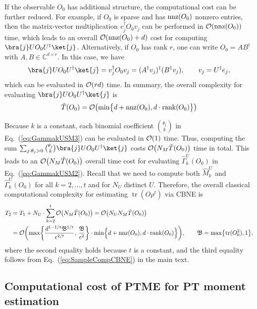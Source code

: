 \documentclass[aps,prl,twocolumn,nofootinbib,superscriptaddress,10pt]{revtex4-2}
\let\originalleft\left
\let\originalright\right
\renewcommand{\left}{\mathopen{}\mathclose\bgroup\originalleft}
\renewcommand{\right}{\aftergroup\egroup\originalright}
\DeclareMathOperator{\Tr}{tr}
\newcommand{\bigo}[1]{\mathcal{O}\left(#1\right)}
\theoremstyle{plain}
\theoremstyle{definition}
\newcommand{\eref}[1]{Eq.~\textup{(\ref{#1})}}
\begin{document}
If the observable $O_0$ has additional structure, the computational cost can be further reduced.
For example, if $O_0$ is sparse and has ${\rm nnz}(O_0)$ nonzero entries, then the  matrix-vector multiplication $v_j^\dagger O_0 v_j$  can be performed in $\bigo{{\rm nnz}(O_0)}$ time, which leads to an overall $\bigo{{\rm nnz}(O_0)+d}$ cost for computing $\bra{j}U O_0 U^\dag\ket{j}$. 
Alternatively, if $O_0$ has rank $r$, one can write $O_0=AB^\dagger$ with $A,B\in\mathbb{C}^{d\times r}$.
In this case, we have 
\begin{equation}
\bra{j}U O_0 U^\dag\ket{j}
=v_j^\dagger O_0 v_j = (A^\dagger v_j)^\dagger (B^\dagger v_j),
\qquad 
v_j=U^\dagger e_j, 
\end{equation}
which can be evaluated in $\bigo{rd}$ time.
In summary, the overall complexity for evaluating $\bra{j}U O_0 U^\dag\ket{j}$ is
\begin{equation}\label{eq:tildeTO}
\tilde T(O_0)= \bigo{ \min\!\big\{ d+{\rm nnz}(O_0), d\cdot {\rm rank}(O_0) \big\} }
\end{equation}

Because $k$ is a constant, each binomial coefficient $\binom{\theta_j}{k}$ in \eref{eq:GammakUSM3}  can be evaluated in $\bigo{1}$ time.
Thus, computing the sum
$\sum_{j:\theta_j>0}\binom{\theta_j}{k}\bra{j}U O_0 U^\dag\ket{j}$
costs $\bigo{N_M \tilde T(O_0)}$ time in total.
This leads to an $\bigo{N_M \tilde T(O_0)}$ overall time cost for evaluating $\hat{\Gamma}_k^U(O_0)$ in \eref{eq:GammakUSM2}.
Recall that we need to compute both $\hat M_k^U$ and $\hat{\Gamma}_k^U(O_0)$ for all $k=2,\dots,t$ and for $N_U$ distinct $U$.
Therefore, the overall classical computational complexity for estimating $\Tr(O\rho^t)$ via CBNE is
\begin{align}
T_2
&=T_1+N_U\cdot\sum_{k=2}^{t}\bigo{N_M \tilde T(O_0)}
=\bigo{N_UN_M \tilde T(O_0)}
\nonumber\\
&=\bigo{\max \left\{\frac{d^{1-1/t}\mathfrak{B}^{1/t}}{\epsilon^{2/t}},\,\frac{\mathfrak{B}}{\epsilon^2}\right\}
\cdot\min\!\Big\{ d+{\rm nnz}(O_0), d\cdot {\rm rank}(O_0) \Big\}}, 
\qquad 
\mathfrak{B}= \max \left\lbrace \Tr(O_0^2),1\right\rbrace, 
\end{align}
where the second equality holds because $t$ is a constant, and the third equality follows from \eref{eq:SampleCompCBNE} in the main text. 


\subsection{Computational cost of PTME for PT moment estimation}
\end{document}
